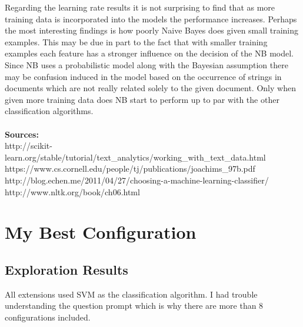 \documentclass[11pt, oneside]{article}   	%
\begin{document}
Regarding the learning rate results it is not surprising to find that as more training data is incorporated into the models the performance increases.  Perhaps the most interesting findings is how poorly Naive Bayes does given small training examples.  This may be due in part to the fact that with smaller training examples each feature has a stronger influence on the decision of the NB model.  Since NB uses a probabilistic model along with the Bayesian assumption there may be confusion induced in the model based on the occurrence of strings in documents which are not really related solely to the given document.  Only when given more training data does NB start to perform up to par with the other classification algorithms.
\\\\
\textbf{Sources:}\\
http://scikit-learn.org/stable/tutorial/text\_analytics/working\_with\_text\_data.html\\
https://www.cs.cornell.edu/people/tj/publications/joachims\_97b.pdf\\
http://blog.echen.me/2011/04/27/choosing-a-machine-learning-classifier/\\
http://www.nltk.org/book/ch06.html

\newpage
\section{My Best Configuration}
\subsection{Exploration Results}
All extensions used SVM as the classification algorithm.  I had trouble understanding the question prompt which is why there are more than 8 configurations included.
\end{document}
